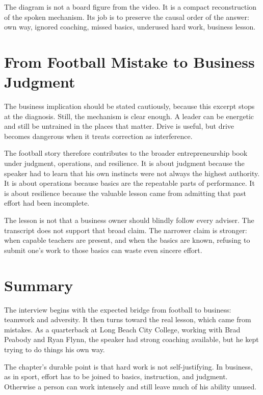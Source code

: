 The diagram is not a board figure from the video. It is a compact reconstruction of the spoken mechanism. Its job is to preserve the causal order of the answer: own way, ignored coaching, missed basics, underused hard work, business lesson.

\section{From Football Mistake to Business Judgment}

The business implication should be stated cautiously, because this excerpt stops at the diagnosis. Still, the mechanism is clear enough. A leader can be energetic and still be untrained in the places that matter. Drive is useful, but drive becomes dangerous when it treats correction as interference.

The football story therefore contributes to the broader entrepreneurship book under judgment, operations, and resilience. It is about judgment because the speaker had to learn that his own instincts were not always the highest authority. It is about operations because basics are the repeatable parts of performance. It is about resilience because the valuable lesson came from admitting that past effort had been incomplete.

The lesson is not that a business owner should blindly follow every adviser. The transcript does not support that broad claim. The narrower claim is stronger: when capable teachers are present, and when the basics are known, refusing to submit one's work to those basics can waste even sincere effort.

\section{Summary}

The interview begins with the expected bridge from football to business: teamwork and adversity. It then turns toward the real lesson, which came from mistakes. As a quarterback at Long Beach City College, working with Brad Peabody and Ryan Flynn, the speaker had strong coaching available, but he kept trying to do things his own way.

The chapter's durable point is that hard work is not self-justifying. In business, as in sport, effort has to be joined to basics, instruction, and judgment. Otherwise a person can work intensely and still leave much of his ability unused.